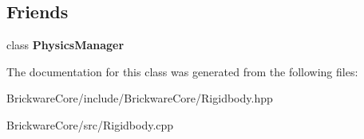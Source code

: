 \subsection*{Friends}
\begin{DoxyCompactItemize}
\item 
\hypertarget{classBrickware_1_1Core_1_1Rigidbody_a139cf05ac01161b7071c8a037c841683}{}class {\bfseries Physics\+Manager}\label{classBrickware_1_1Core_1_1Rigidbody_a139cf05ac01161b7071c8a037c841683}

\end{DoxyCompactItemize}


The documentation for this class was generated from the following files\+:\begin{DoxyCompactItemize}
\item 
Brickware\+Core/include/\+Brickware\+Core/Rigidbody.\+hpp\item 
Brickware\+Core/src/Rigidbody.\+cpp\end{DoxyCompactItemize}
